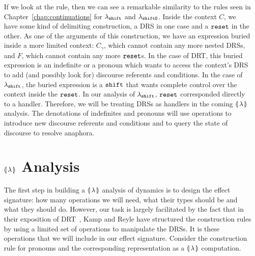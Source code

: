 If we look at the rule, then we can see a remarkable similarity to the
rules seen in Chapter~\ref{chap:continuations} for $\lambda_{\mathtt{shift}}$ and
$\lambda_{\mathtt{shift0}}$. Inside the context $C$, we have some kind of delimiting
construction, a DRS in one case and a $\mathtt{reset}$ in the other. As one of the
arguments of this construction, we have an expression buried inside a more
limited context: $C_\gamma$, which cannot contain any more nested DRSs, and
$F$, which cannot contain any more $\mathtt{reset}$s. In the case of DRT, this
buried expression is an indefinite or a pronoun which wants to access the
context's DRS to add (and possibly look for) discourse referents and
conditions. In the case of $\lambda_{\mathtt{shift}}$, the buried expression is a
$\mathtt{shift}$ that wants complete control over the context inside the
$\mathtt{reset}$. In our analysis of $\lambda_{\mathtt{shift}}$, $\mathtt{reset}$ corresponded
directly to a handler. Therefore, we will be treating DRSs as handlers in
the coming $\llparenthesis \, \lambda \, \rrparenthesis$ analysis. The denotations of indefinites and
pronouns will use operations to introduce new discourse referents and
conditions and to query the state of discourse to resolve anaphora.


\section{\texorpdfstring{$\llparenthesis \, \lambda \, \rrparenthesis$ Analysis}{Analysis in Our Calculus}}
\label{sec:banana-drt}

The first step in building a $\llparenthesis \, \lambda \, \rrparenthesis$ analysis of dynamics is to
design the effect signature: how many operations we will need, what their
types should be and what they should do. However, our task is largely
facilitated by the fact that in their exposition of
DRT~\cite{kamp1993discourse}, Kamp and Reyle have structured the
construction rules by using a limited set of operations to manipulate the
DRSs. It is these operations that we will include in our effect
signature. Consider the construction rule for pronouns and the
corresponding representation as a $\llparenthesis \, \lambda \, \rrparenthesis$ computation.

\vspace{6mm}

